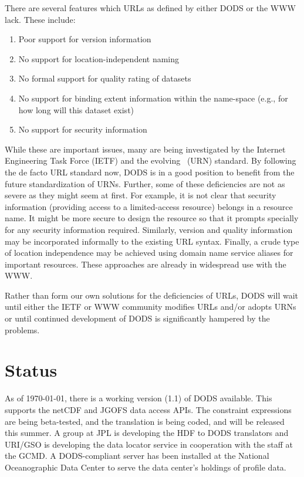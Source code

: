 There are several features which URLs as defined by either DODS or the WWW
lack. These include:

\begin{enumerate}

\item Poor support for version information

\item No support for location-independent naming

\item No formal support for quality rating of datasets

\item No support for binding extent information within the name-space (e.g.,
  for how long will this dataset exist)

\item No support for security information

\end{enumerate}

While these are important issues, many are being investigated by the
Internet Engineering Task Force (IETF) and the evolving \urn\ (URN)
standard. By following the de facto URL standard now, DODS is in a
good position to benefit from the future standardization of
URNs. Further, some of these deficiencies are not as severe as they
might seem at first. For example, it is not clear that security
information (providing access to a limited-access resource) belongs in
a resource name. It might be more secure to design the resource so
that it prompts specially for any security information
required. Similarly, version and quality information may be
incorporated informally to the existing URL syntax.  Finally, a crude
type of location independence may be achieved using domain name
service aliases for important resources. These approaches are already
in widespread use with the WWW\@.

Rather than form our own solutions for the deficiencies of URLs, DODS
will wait until either the IETF or WWW community modifies URLs and/or
adopts URNs or until continued development of DODS is significantly
hampered by the problems.

\section{Status}

As of \today, there is a working version (1.1) of DODS available. This
supports the netCDF and JGOFS data access APIs. The constraint
expressions are being beta-tested, and the translation is being coded,
and will be released this summer. A group at JPL is developing the HDF
to DODS translators and URI/GSO is developing the data locator service
in cooperation with the staff at the GCMD. A DODS-compliant server has
been installed at the National Oceanographic Data Center to serve the
data center's holdings of profile data.

